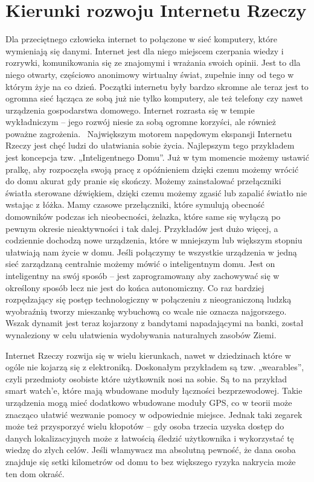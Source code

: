 \documentclass[brudnopis]{xmgr}
\begin{document}
\chapter{Kierunki rozwoju Internetu Rzeczy}
Dla przeciętnego człowieka internet to połączone w sieć komputery, które wymieniają się danymi. Internet jest dla niego miejscem czerpania wiedzy i rozrywki, komunikowania się ze znajomymi i wrażania swoich opinii. Jest to dla niego otwarty, częściowo anonimowy wirtualny świat, zupełnie inny od tego w którym żyje na co dzień. Początki internetu były bardzo skromne ale teraz jest to ogromna sieć łącząca ze sobą już nie tylko komputery, ale też telefony czy nawet urządzenia gospodarstwa domowego. Internet rozrasta się w tempie wykładniczym – jego rozwój niesie za sobą ogromne korzyści, ale również poważne zagrożenia.~\cite{Nsr:2015:CFG}
Największym motorem napędowym ekspansji Internetu Rzeczy jest chęć ludzi do ułatwiania sobie życia. Najlepszym tego przykładem jest koncepcja tzw. „Inteligentnego Domu”. Już w tym momencie możemy ustawić pralkę, aby rozpoczęła swoją pracę z opóźnieniem dzięki czemu możemy wrócić do domu akurat gdy pranie się skończy. Możemy zainstalować przełączniki światła sterowane dźwiękiem, dzięki czemu możemy zgasić lub zapalić światło nie wstając z łóżka. Mamy czasowe przełączniki, które symulują obecność domowników podczas ich nieobecności, żelazka, które same się wyłączą po pewnym okresie nieaktywności i tak dalej. Przykładów jest dużo więcej, a codziennie dochodzą nowe urządzenia, które w mniejszym lub większym stopniu ułatwiają nam życie w domu. Jeśli połączymy te wszystkie urządzenia w jedną sieć zarządzaną centralnie możemy mówić o inteligentnym domu. Jest on inteligentny na swój sposób – jest zaprogramowany aby zachowywać się w określony sposób lecz nie jest do końca autonomiczny. Co raz bardziej rozpędzający się postęp technologiczny w połączeniu z nieograniczoną ludzką wyobraźnią tworzy mieszankę wybuchową co wcale nie oznacza najgorszego. Wszak dynamit jest teraz kojarzony z bandytami napadającymi na banki, został wynaleziony w celu ułatwienia wydobywania naturalnych zasobów Ziemi.

Internet Rzeczy rozwija się w wielu kierunkach, nawet w dziedzinach które w ogóle nie kojarzą się z elektroniką. Doskonałym przykładem są tzw. „wearables”, czyli przedmioty osobiste które użytkownik nosi na sobie. Są to na przykład smart watch'e, które mają wbudowane moduły łączności bezprzewodowej.  Takie urządzenia mogą mieć dodatkowo wbudowane moduły GPS, co w teorii może znacząco ułatwić wezwanie pomocy w odpowiednie miejsce. Jednak taki zegarek może też przysporzyć wielu kłopotów – gdy osoba trzecia uzyska dostęp do danych lokalizacyjnych  może z łatwością śledzić użytkownika i wykorzystać tę wiedzę do złych celów. Jeśli włamywacz ma absolutną pewność, że dana osoba znajduje się setki kilometrów od domu to bez większego ryzyka nakrycia może ten dom okraść.
\end{document}
